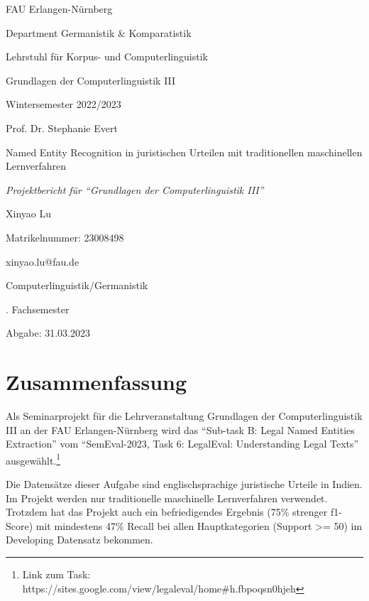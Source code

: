 \documentclass[paper=A4, ngerman, fontsize=12pt]{article}
\begin{document}
	\thispagestyle{empty}
	{\large\noindent
		FAU Erlangen-Nürnberg
		
		\medskip\noindent
		Department Germanistik \& Komparatistik
		
		\medskip\noindent
		Lehrstuhl für Korpus- und Computerlinguistik
		
		\medskip\noindent
		Grundlagen der Computerlinguistik III
		
		\medskip\noindent
		Wintersemester 2022/2023
		
		\medskip\noindent
		Prof. Dr. Stephanie Evert
	}
	
	\vspace*{\fill}
	\begin{center}
		{\large Named Entity Recognition in juristischen Urteilen mit traditionellen maschinellen Lernverfahren}
		
		\medskip\noindent
		{\large
			\textit{Projektbericht für \enquote{Grundlagen der Computerlinguistik III}}
		}
		
	\end{center}
	\vspace*{\fill}
	
	
	\mbox{}
	\vfill
	{\large
		\noindent
		Xinyao Lu
		
		\medskip\noindent
		Matrikelnummer: 23008498
		
		\medskip\noindent
		xinyao.lu@fau.de
		
		\medskip\noindent
		Computerlinguistik/Germanistik
		
		\medskip{}. Fachsemester
		
		\medskip\noindent
		Abgabe: 31.03.2023
	}
	
	\clearpage
	
	
	\thispagestyle{empty}
	\tableofcontents
	\listoffigures
	\listoftables
	
	\clearpage
	
	\section{Zusammenfassung}
	\noindent
	Als Seminarprojekt für die Lehrveranstaltung Grundlagen der Computerlinguistik III an der FAU Erlangen-Nürnberg wird das \enquote{Sub-task B: Legal Named Entities Extraction} vom \enquote{SemEval-2023, Task 6: LegalEval: Understanding Legal Texts} ausgewählt.\footnote{Link zum Task: https://sites.google.com/view/legaleval/home\#h.fbpoqsn0hjeh}
	
	Die Datensätze dieser Aufgabe sind englischsprachige juristische Urteile in Indien. Im Projekt werden nur traditionelle maschinelle Lernverfahren verwendet. Trotzdem hat das Projekt auch ein befriedigendes Ergebnis (75\% strenger f1-Score) mit mindestens 47\% Recall bei allen Hauptkategorien (Support >= 50) im Developing Datensatz bekommen. 
	
\end{document}
